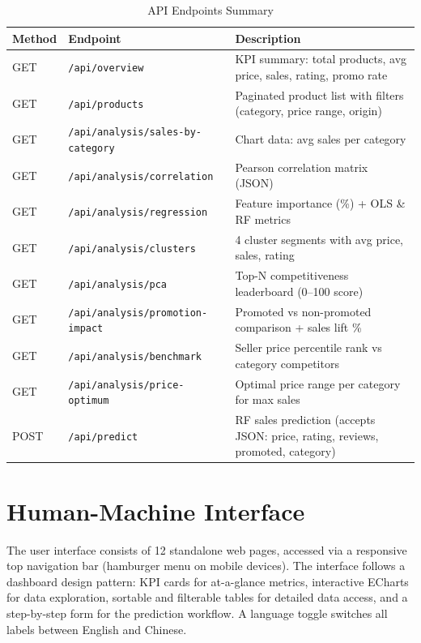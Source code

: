 \documentclass[12pt,a4paper]{report}
\begin{document}
\begin{table}[H]
  \centering
  \caption{API Endpoints Summary}
  \begin{tabular}{@{}llp{5.5cm}@{}}
    \toprule
    \textbf{Method} & \textbf{Endpoint} & \textbf{Description} \\
    \midrule
    GET  & \texttt{/api/overview}              & KPI summary: total products, avg price, sales, rating, promo rate \\
    GET  & \texttt{/api/products}              & Paginated product list with filters (category, price range, origin) \\
    GET  & \texttt{/api/analysis/sales-by-category} & Chart data: avg sales per category \\
    GET  & \texttt{/api/analysis/correlation}  & Pearson correlation matrix (JSON) \\
    GET  & \texttt{/api/analysis/regression}   & Feature importance (\%) + OLS \& RF metrics \\
    GET  & \texttt{/api/analysis/clusters}     & 4 cluster segments with avg price, sales, rating \\
    GET  & \texttt{/api/analysis/pca}          & Top-N competitiveness leaderboard (0--100 score) \\
    GET  & \texttt{/api/analysis/promotion-impact} & Promoted vs non-promoted comparison + sales lift \% \\
    GET  & \texttt{/api/analysis/benchmark}    & Seller price percentile rank vs category competitors \\
    GET  & \texttt{/api/analysis/price-optimum}& Optimal price range per category for max sales \\
    POST & \texttt{/api/predict}               & RF sales prediction (accepts JSON: price, rating, reviews, promoted, category) \\
    \bottomrule
  \end{tabular}
\end{table}

\section{Human-Machine Interface}

The user interface consists of 12 standalone web pages, accessed via a responsive top navigation bar (hamburger menu on mobile devices). The interface follows a dashboard design pattern: KPI cards for at-a-glance metrics, interactive ECharts for data exploration, sortable and filterable tables for detailed data access, and a step-by-step form for the prediction workflow. A language toggle switches all labels between English and Chinese.
\end{document}
